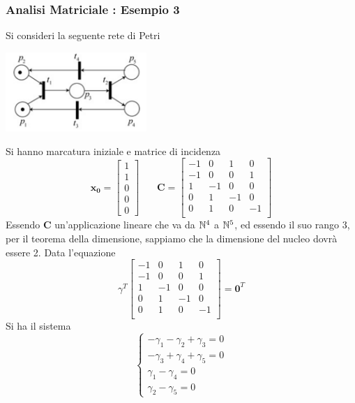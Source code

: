 \documentclass[10pt, letterpaper]{report}
\begin{document}
\subsubsection{Analisi Matriciale : Esempio 3} 
Si consideri la seguente rete di Petri
\begin{center}
    \includegraphics[width=0.4\textwidth]{images/petriMatrix3.png}
\end{center}
Si hanno marcatura iniziale e matrice di incidenza 
$$\mathbf{x_0}=\begin{bmatrix}
    1\\ 1\\ 0\\ 0 \\ 0
\end{bmatrix} \ \ \ \  \ \ \ \ 
\mathbf{C}=\begin{bmatrix}
    -1 & 0 & 1 & 0 \\ 
    -1 & 0 & 0 & 1 \\ 
    1 & -1 & 0 & 0 \\ 
    0 & 1 & -1 & 0 \\ 
    0 & 1 & 0 & -1 \\ 
\end{bmatrix}
$$
Essendo $\mathbf C$ un'applicazione lineare che va da ${\mathbb N}^4$ a ${\mathbb N}^5$, ed essendo il suo rango $3$, per il teorema della dimensione, sappiamo che la dimensione del nucleo dovrà essere 2. Data l'equazione
$$\gamma^T\begin{bmatrix}
    -1 & 0 & 1 & 0 \\ 
    -1 & 0 & 0 & 1 \\ 
    1 & -1 & 0 & 0 \\ 
    0 & 1 & -1 & 0 \\ 
    0 & 1 & 0 & -1 \\ 
\end{bmatrix}=\mathbf 0^T 
$$
Si ha il sistema 
$$\begin{cases}
    -\gamma_1-\gamma_2+\gamma_3=0\\ 
    -\gamma_3+\gamma_4+\gamma_5=0\\ 
    \gamma_1-\gamma_4=0\\ 
    \gamma_2-\gamma_5=0
\end{cases} $$
\end{document}
